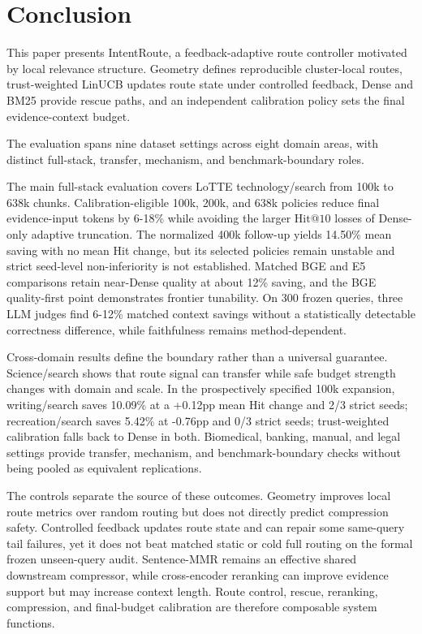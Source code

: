 
\section{Conclusion}
\label{sec:09-conclusion:conclusion}

This paper presents IntentRoute, a feedback-adaptive route controller motivated by local relevance structure. Geometry defines reproducible cluster-local routes, trust-weighted LinUCB updates route state under controlled feedback, Dense and BM25 provide rescue paths, and an independent calibration policy sets the final evidence-context budget.

The evaluation spans nine dataset settings across eight domain areas, with distinct full-stack, transfer, mechanism, and benchmark-boundary roles.

The main full-stack evaluation covers LoTTE technology/search from 100k to 638k chunks. Calibration-eligible 100k, 200k, and 638k policies reduce final evidence-input tokens by 6-18\% while avoiding the larger $\mathrm{Hit@10}$ losses of Dense-only adaptive truncation. The normalized 400k follow-up yields 14.50\% mean saving with no mean Hit change, but its selected policies remain unstable and strict seed-level non-inferiority is not established. Matched BGE and E5 comparisons retain near-Dense quality at about 12\% saving, and the BGE quality-first point demonstrates frontier tunability. On 300 frozen queries, three LLM judges find 6-12\% matched context savings without a statistically detectable correctness difference, while faithfulness remains method-dependent.

Cross-domain results define the boundary rather than a universal guarantee. Science/search shows that route signal can transfer while safe budget strength changes with domain and scale. In the prospectively specified 100k expansion, writing/search saves 10.09\% at a +0.12pp mean Hit change and 2/3 strict seeds; recreation/search saves 5.42\% at -0.76pp and 0/3 strict seeds; trust-weighted calibration falls back to Dense in both. Biomedical, banking, manual, and legal settings provide transfer, mechanism, and benchmark-boundary checks without being pooled as equivalent replications.

The controls separate the source of these outcomes. Geometry improves local route metrics over random routing but does not directly predict compression safety. Controlled feedback updates route state and can repair some same-query tail failures, yet it does not beat matched static or cold full routing on the formal frozen unseen-query audit. Sentence-MMR remains an effective shared downstream compressor, while cross-encoder reranking can improve evidence support but may increase context length. Route control, rescue, reranking, compression, and final-budget calibration are therefore composable system functions.

